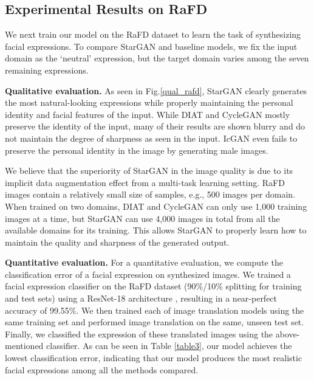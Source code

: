 \documentclass[10pt,twocolumn,letterpaper]{article}
\begin{document}
\subsection{Experimental Results on RaFD}
We next train our model on the RaFD dataset to learn the task of synthesizing facial expressions. To compare StarGAN and baseline models, we fix the input domain as the `neutral' expression, but the target domain varies among the seven remaining expressions.

\medskip

\noindent\textbf{Qualitative evaluation.} As seen in Fig.\thinspace\ref{qual_rafd}, StarGAN clearly generates the most natural-looking expressions while properly maintaining the personal identity and facial features of the input. While DIAT and CycleGAN mostly preserve the identity of the input, many of their results are shown blurry and do not maintain the degree of sharpness as seen in the input. IcGAN even fails to preserve the personal identity in the image by generating male images. 

We believe that the superiority of StarGAN in the image quality is due to its implicit data augmentation effect from a multi-task learning setting. RaFD images contain a relatively small size of samples, e.g., 500 images per domain. When trained on two domains, DIAT and CycleGAN can only use 1,000 training images at a time, but StarGAN can use 4,000 images in total from all the available domains for its training. This allows StarGAN to properly learn how to maintain the quality and sharpness of the generated output.

\medskip

\noindent \textbf{Quantitative evaluation.} For a quantitative evaluation, we compute the classification error of a facial expression on synthesized images. We trained a facial expression classifier on the RaFD dataset (90\%/10\% splitting for training and test sets) using a ResNet-18 architecture \cite{he2016deep}, resulting in a near-perfect accuracy of 99.55\%. We then trained each of image translation models using the same training set and performed image translation on the same, unseen test set. Finally, we classified the expression of these translated images using the above-mentioned classifier. As can be seen in Table \ref{table3}, our model achieves the lowest classification error, indicating that our model produces the most realistic facial expressions among all the methods compared.
\end{document}
